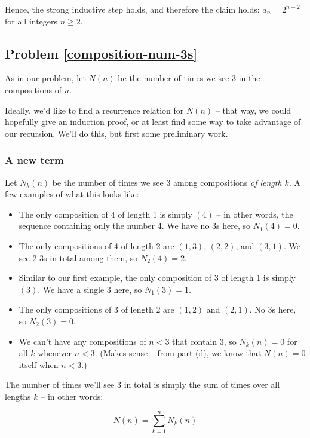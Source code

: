 Hence, the strong inductive step holds, and therefore the claim holds: $a_n = 2^{n-2}$ for all integers $n \geq 2$. 


\subsection{Problem \ref{composition-num-3s}}

As in our problem, let $N(n)$ be the number of times we see 3 in the compositions of $n$. 

Ideally, we'd like to find a recurrence relation for $N(n)$ -- that way, we could hopefully give an induction proof, or at least find some way to take advantage of our recursion. We'll do this, but first some preliminary work.

\subsubsection{A new term}

Let $N_k(n)$ be the number of times we see 3 among compositions \emph{of length $k$}. A few examples of what this looks like:

\begin{itemize}
\item The only composition of 4 of length 1 is simply $(4)$ -- in other words, the sequence containing only the number 4. We have no 3s here, so $N_1(4) = 0$.
\item The only compositions of 4 of length 2 are $(1,3)$, $(2,2)$, and $(3,1)$. We see 2 3s in total among them, so $N_2(4) = 2$.
\item Similar to our first example, the only composition of 3 of length 1 is simply $(3)$. We have a single 3 here, so $N_1(3) = 1$.
\item The only compositions of 3 of length 2 are $(1,2)$ and $(2,1)$. No 3s here, so $N_2(3) = 0$.
\item We can't have any compositions of $n < 3$ that contain 3, so $N_k(n) = 0$ for all $k$ whenever $n < 3$. (Makes sense -- from part (d), we know that $N(n) = 0$ itself when $n < 3$.)
\end{itemize}


The number of times we'll see 3 in total is simply the sum of times over all lengths $k$ -- in other words:

\begin{equation}
\label{eq:nk-n-sum-original}
N(n) = \sum_{k=1}^{n} N_k(n)
\end{equation}

